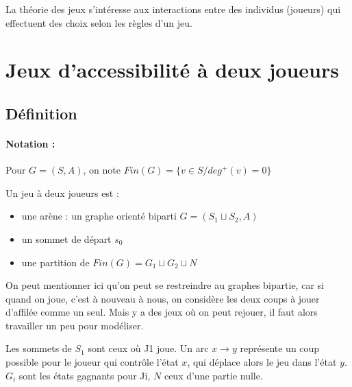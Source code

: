 
La théorie des jeux s'intéresse aux interactions entre des individus (joueurs) qui effectuent des choix selon les règles d'un jeu.

\section{Jeux d'accessibilité à deux joueurs}

\subsection{Définition}

\paragraph{Notation :} Pour $G = (S, A)$, on note $Fin(G) = \{v \in S / deg^+(v) = 0\}$

\begin{definition}
	\label{16-def-jeu}
	Un jeu à deux joueurs est :\begin{itemize}
		\item une arène : un graphe orienté biparti $G = (S_1 \sqcup S_2, A)$
		\item un sommet de départ $s_0$
		\item une partition de $Fin(G) = G_1 \sqcup G_2 \sqcup N$
	\end{itemize}
\end{definition}

\begin{com}
	On peut mentionner ici qu'on peut se restreindre au graphes bipartie, car si quand on joue, c'est à nouveau à nous, on considère les deux coups à jouer d'affilée comme un seul. Mais y a des jeux où on peut rejouer, il faut alors travailler un peu pour modéliser.
\end{com}

\begin{idee}
	Les sommets de $S_1$ sont ceux où J1 joue. Un arc $x \to y$ représente un coup possible pour le joueur qui contrôle l'état $x$, qui déplace alors le jeu dans l'état $y$. $G_i$ sont les états gagnants pour Ji, $N$ ceux d'une partie nulle.
\end{idee}

